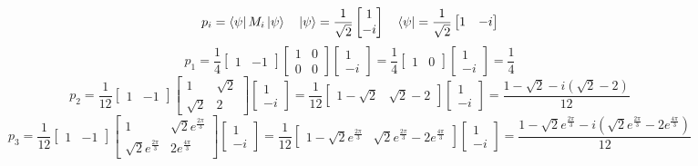 \documentclass{../notatki}
\begin{document}
$$
p_i = \bra{\psi} M_i \ket{\psi} \quad \ket{\psi} = \frac{1}{\sqrt{2}}
\begin{bmatrix}
  1 \\ -i
\end{bmatrix}
\quad \bra{\psi} = \frac{1}{\sqrt{2}}
\begin{bmatrix}
  1 & -i
\end{bmatrix}
$$
$$
p_1 = \frac{1}{4}
\begin{bmatrix}
  1 & -1
\end{bmatrix}
\begin{bmatrix}
  1 & 0
  \\ 0 & 0
\end{bmatrix}
\begin{bmatrix}
  1 \\ -i
\end{bmatrix} = \frac{1}{4}
\begin{bmatrix}
  1 & 0
\end{bmatrix}
\begin{bmatrix}
  1 \\ -i
\end{bmatrix} = \frac{1}{4}
$$
$$
p_2 = \frac{1}{12}
\begin{bmatrix}
  1 & -1
\end{bmatrix}
\begin{bmatrix}
  1 & \sqrt{2} \\
  \sqrt{2} & 2
\end{bmatrix}
\begin{bmatrix}
  1 \\ -i
\end{bmatrix} = \frac{1}{12}
\begin{bmatrix}
  1 - \sqrt{2} & \sqrt{2} - 2
\end{bmatrix}
\begin{bmatrix}
  1 \\ -i
\end{bmatrix} = \frac{1 - \sqrt{2} -i(\sqrt{2} - 2)}{12}
$$
$$
p_3 = \frac{1}{12}
\begin{bmatrix}
  1 & -1
\end{bmatrix}
\begin{bmatrix}
  1 & \sqrt{2}e^{\frac{2\pi}{3}} \\
  \sqrt{2}e^{\frac{2\pi}{3}} & 2e^{\frac{4\pi}{3}}
\end{bmatrix}
\begin{bmatrix}
  1 \\ -i
\end{bmatrix} = \frac{1}{12}
\begin{bmatrix}
  1 - \sqrt{2}e^{\frac{2\pi}{3}} & \sqrt{2}e^{\frac{2\pi}{3}} -
  2e^{\frac{4\pi}{3}}
\end{bmatrix}
\begin{bmatrix}
  1 \\ -i
\end{bmatrix} = \frac{1 - \sqrt{2}e^{\frac{2\pi}{3}} -
i(\sqrt{2}e^{\frac{2\pi}{3}} - 2e^{\frac{4\pi}{3}})}{12}
$$
\end{document}
